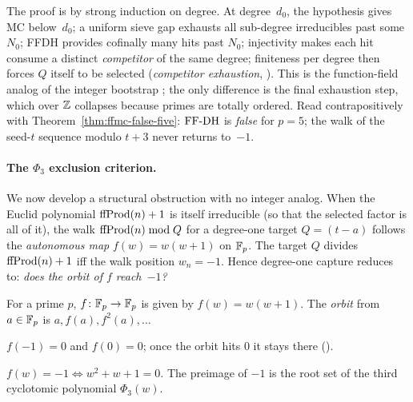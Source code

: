 The proof is by strong induction on degree.  At degree~$d_0$, the
hypothesis gives MC below~$d_0$; a uniform sieve gap exhausts all
sub-degree irreducibles past some $N_0$; FFDH provides cofinally many
hits past $N_0$; injectivity makes each hit consume a distinct
\emph{competitor} of the same degree; finiteness per degree then forces
$Q$ itself to be selected (\emph{competitor exhaustion},
).  This is
the function-field analog of the integer bootstrap
; the only difference is the
final exhaustion step, which over $\mathbb{Z}$ collapses because primes are
totally ordered.  Read contrapositively with
Theorem~\ref{thm:ffmc-false-five}: $\mathrm{FF\text{-}DH}$ is \emph{false} for $p = 5$;
the walk of the seed-$t$ sequence modulo $t+3$ never returns to~$-1$.

\paragraph{The \texorpdfstring{$\Phi_3$}{Phi3} exclusion criterion.}

We now develop a structural obstruction with no integer analog.  When
the Euclid polynomial $\mathrm{ffProd}(n)+1$ is itself irreducible (so that the
selected factor is all of it), the walk
$\mathrm{ffProd}(n) \bmod Q$ for a degree-one target $Q = (t-a)$ follows the
\emph{autonomous map} $f(w) = w(w+1)$ on $\mathbb{F}_p$.  The target $Q$ divides
$\mathrm{ffProd}(n)+1$ iff the walk position $w_n = -1$.  Hence degree-one
capture reduces to: \emph{does the orbit of $f$ reach~$-1$?}

\begin{definition}
\label{def:autonomous}
For a prime $p$, $f \colon \mathbb{F}_p \to \mathbb{F}_p$ is given by $f(w) = w(w+1)$.
The \emph{orbit} from $a \in \mathbb{F}_p$ is $a, f(a), f^2(a), \ldots$
\end{definition}

\begin{lemma}
$f(-1) = 0$ and $f(0) = 0$; once the orbit hits $0$ it stays there
().
\end{lemma}

\begin{lemma}
\label{lem:phi3}
$f(w) = -1 \iff w^2+w+1 = 0$.  The preimage of $-1$ is the root set of
the third cyclotomic polynomial $\Phi_3(w)$.
\end{lemma}

